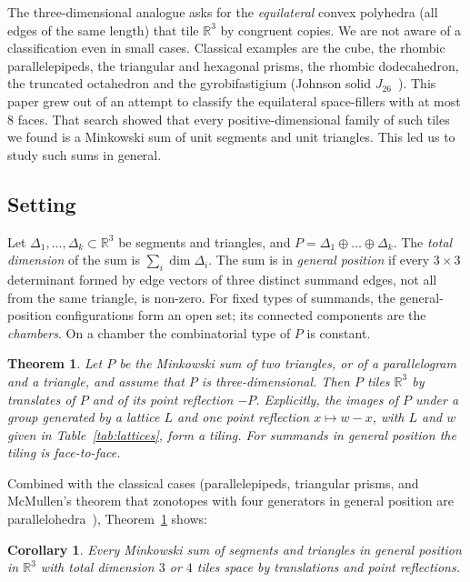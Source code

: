 \documentclass[11pt]{amsart}
\newtheorem{theorem}{Theorem}
\newtheorem{corollary}[thm]{Corollary}
\theoremstyle{definition}
\newcommand{\R}{\mathbb{R}}
\newcommand{\msum}{\oplus}
\begin{document}
The three-dimensional analogue asks for the \emph{equilateral} convex polyhedra (all edges of the same length)
that tile $\R^3$ by congruent copies. We are not aware of a classification even in small cases. Classical
examples are the cube, the rhombic parallelepipeds, the triangular and hexagonal prisms, the rhombic
dodecahedron, the truncated octahedron and the gyrobifastigium (Johnson solid $J_{26}$~\cite{Joh66}). This paper grew out of an
attempt to classify the equilateral space-fillers with at most $8$ faces. That search showed that every
positive-dimensional family of such tiles we found is a Minkowski sum of unit segments and unit triangles. This
led us to study such sums in general.

\subsection*{Setting}
Let $\Delta_1, \dots, \Delta_k \subset \R^3$ be segments and triangles, and $P = \Delta_1 \msum \dots \msum
\Delta_k$. The \emph{total dimension} of the sum is $\sum_i \dim \Delta_i$. The sum is in \emph{general position} if
every $3\times 3$ determinant formed by edge vectors of three distinct summand edges, not all from the same
triangle, is non-zero. For fixed types of summands, the general-position configurations form an open set; its
connected components are the \emph{chambers}. On a chamber the combinatorial type of $P$ is constant.

\begin{theorem}\label{thm:A}
Let $P$ be the Minkowski sum of two triangles, or of a parallelogram and a triangle, and assume that $P$ is
three-dimensional. Then $P$ tiles $\R^3$ by translates of $P$ and of its point reflection $-P$. Explicitly, the
images of $P$ under a group generated by a lattice $L$ and one point reflection $x\mapsto w-x$, with $L$ and $w$ given in
Table~\ref{tab:lattices}, form a tiling. For summands in general position the tiling is face-to-face.
\end{theorem}

Combined with the classical cases (parallelepipeds, triangular prisms, and McMullen's theorem that zonotopes
with four generators in general position are parallelohedra~\cite{McM75}), Theorem~\ref{thm:A} shows:

\begin{corollary}\label{cor:le4}
Every Minkowski sum of segments and triangles in general position in $\R^3$ with total dimension $3$ or $4$ tiles
space by translations and point reflections.
\end{corollary}
\end{document}
